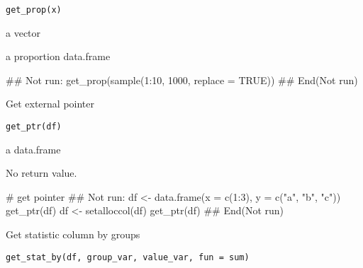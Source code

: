 \documentclass[letterpaper]{book}
\begin{document}
%
\begin{Usage}
\begin{verbatim}
get_prop(x)
\end{verbatim}
\end{Usage}
%
\begin{Arguments}
\begin{ldescription}
\item[\code{x}] a vector
\end{ldescription}
\end{Arguments}
%
\begin{Value}
a proportion data.frame
\end{Value}
%
\begin{Examples}
\begin{ExampleCode}
## Not run: 
get_prop(sample(1:10, 1000, replace = TRUE))
## End(Not run)

\end{ExampleCode}
\end{Examples}
%
\begin{Description}
Get external pointer
\end{Description}
%
\begin{Usage}
\begin{verbatim}
get_ptr(df)
\end{verbatim}
\end{Usage}
%
\begin{Arguments}
\begin{ldescription}
\item[\code{df}] a data.frame
\end{ldescription}
\end{Arguments}
%
\begin{Value}
No return value.
\end{Value}
%
\begin{Examples}
\begin{ExampleCode}
# get pointer
## Not run: 
df <- data.frame(x = c(1:3), y = c("a", "b", "c"))
get_ptr(df)
df <- setalloccol(df)
get_ptr(df)
## End(Not run)

\end{ExampleCode}
\end{Examples}
%
\begin{Description}
Get statistic column by groups
\end{Description}
%
\begin{Usage}
\begin{verbatim}
get_stat_by(df, group_var, value_var, fun = sum)
\end{verbatim}
\end{Usage}
\end{document}
